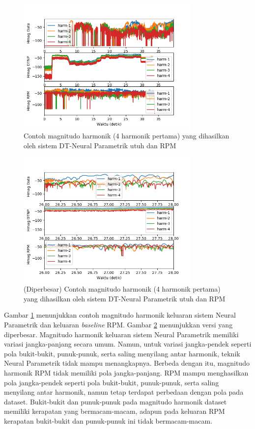 \begin{figure}[htbp]
    \centering
    \includegraphics[width=0.8\textwidth]{resources/Analisis_wholesystem_Hmag.png}
    \caption{Contoh magnitudo harmonik (4 harmonik pertama) yang dihasilkan oleh sistem DT-Neural Parametrik utuh dan RPM}\label{fig-wholesystem-hmag-output-sample}
\end{figure}

\begin{figure}[htbp]
    \centering
    \includegraphics[width=0.8\textwidth]{resources/Analisis_wholesystem_Hmag_zoomed.png}
    \caption{(Diperbesar) Contoh magnitudo harmonik (4 harmonik pertama) yang dihasilkan oleh sistem DT-Neural Parametrik utuh dan RPM}\label{fig-wholesystem-hmag-output-sample-zoomed}
\end{figure}

Gambar \ref{fig-wholesystem-hmag-output-sample} menunjukkan contoh magnitudo harmonik keluaran sistem Neural Parametrik dan keluaran \textit{baseline} RPM. Gambar \ref{fig-wholesystem-hmag-output-sample-zoomed} menunjukkan versi yang diperbesar. Magnitudo harmonik keluaran sistem Neural Parametrik memiliki variasi jangka-panjang secara umum. Namun, untuk variasi jangka-pendek seperti pola bukit-bukit, punuk-punuk, serta saling menyilang antar harmonik, teknik Neural Parametrik tidak mampu menangkapnya. Berbeda dengan itu, magnitudo harmonik RPM tidak memiliki pola jangka-panjang. RPM mampu menghasilkan pola jangka-pendek seperti pola bukit-bukit, punuk-punuk, serta saling menyilang antar harmonik, namun tetap terdapat perbedaan dengan pola pada dataset. Bukit-bukit dan punuk-punuk pada magnitudo harmonik dataset memiliki kerapatan yang bermacam-macam, adapun pada keluaran RPM kerapatan bukit-bukit dan punuk-punuk ini tidak bermacam-macam.

